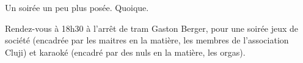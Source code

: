 Un soirée un peu plus posée. Quoique.

Rendez-vous à 18h30 à l'arrêt de tram Gaston Berger, pour une soirée jeux de société (encadrée par les maitres
en la matière, les membres de l'association Cluji) et karaoké (encadré
par des nuls en la matière, les orgas).
